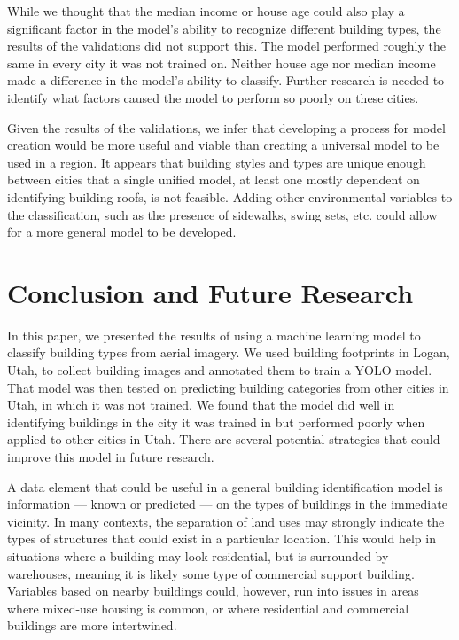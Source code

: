 \documentclass[conference,]{IEEEtran}
\begin{document}
While we thought that the median income or house age could also play a
significant factor in the model's ability to recognize different
building types, the results of the validations did not support this. The
model performed roughly the same in every city it was not trained on.
Neither house age nor median income made a difference in the model's
ability to classify. Further research is needed to identify what factors
caused the model to perform so poorly on these cities.

Given the results of the validations, we infer that developing a process
for model creation would be more useful and viable than creating a
universal model to be used in a region. It appears that building styles
and types are unique enough between cities that a single unified model,
at least one mostly dependent on identifying building roofs, is not
feasible. Adding other environmental variables to the classification,
such as the presence of sidewalks, swing sets, etc. could allow for a
more general model to be developed.

\section{Conclusion and Future
Research}\label{conclusion-and-future-research}

In this paper, we presented the results of using a machine learning
model to classify building types from aerial imagery. We used building
footprints in Logan, Utah, to collect building images and annotated them
to train a YOLO model. That model was then tested on predicting building
categories from other cities in Utah, in which it was not trained. We
found that the model did well in identifying buildings in the city it
was trained in but performed poorly when applied to other cities in
Utah. There are several potential strategies that could improve this
model in future research.

A data element that could be useful in a general building identification
model is information --- known or predicted --- on the types of
buildings in the immediate vicinity. In many contexts, the separation of
land uses may strongly indicate the types of structures that could exist
in a particular location. This would help in situations where a building
may look residential, but is surrounded by warehouses, meaning it is
likely some type of commercial support building. Variables based on
nearby buildings could, however, run into issues in areas where
mixed-use housing is common, or where residential and commercial
buildings are more intertwined.
\end{document}
